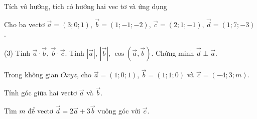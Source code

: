 
\begin{dang}{Tích vô hướng, tích có hướng hai vec tơ và ứng dụng}
\end{dang}
\viduminhhoa
\begin{vd}
	Cho ba vectơ $\vec{a} = (3; 0; 1)$, $\vec{b} = (1; -1; -2)$, $\vec{c} = (2; 1; -1)$, $\vec{d} = (1; 7; -3)$.
	\begin{tasks}(3)
		\task Tính $\vec{a}\cdot \vec{b}$, $\vec{b}\cdot \vec{c}$.
		\task Tính $\left| \vec{a} \right|$, $\left| \vec{b} \right|$, $\cos \left(\vec{a}, \vec{b}\right)$.
		\task Chứng minh $\vec{d} \perp \vec{a}$.
	\end{tasks}
\end{vd}

\begin{vd}
	Trong không gian $Oxyz$, cho $\vec{a}=(1;0;1)$, $\vec{b}=(1;1;0)$ và $\vec{c}=(-4;3;m)$.
	\begin{listEX}
		\item Tính góc giữa hai vectơ $\vec{a}$ và $\vec{b}$.
		\item Tìm $m$ để vectơ $\vec{d}=2\vec{a}+3\vec{b}$ vuông góc với $\vec{c}$.
	\end{listEX}
\end{vd}

